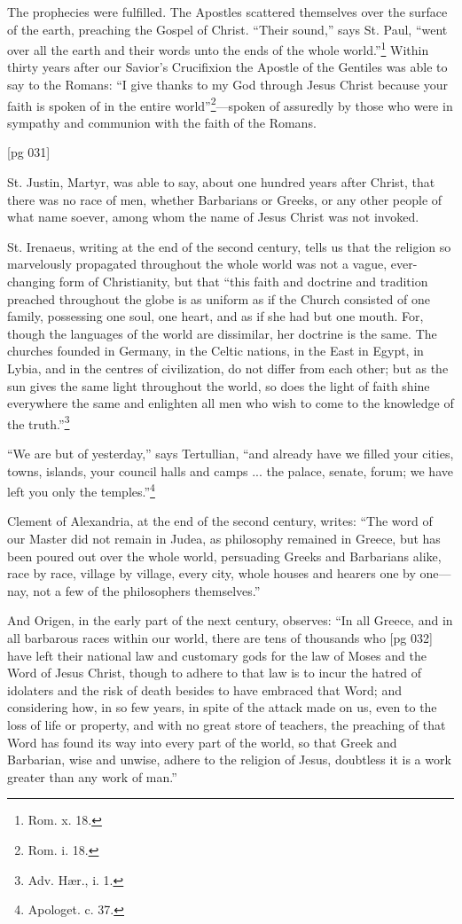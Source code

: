 The prophecies were fulfilled. The Apostles
scattered themselves over the surface of the earth,
preaching the Gospel of Christ. “Their sound,”
says St. Paul, “went over all the earth and their
words unto the ends of the whole world.”\footnote{Rom. x. 18.} Within
thirty years after our Savior's Crucifixion the
Apostle of the Gentiles was able to say to the
Romans: “I give thanks to my God through Jesus
Christ because your faith is spoken of in the entire
world”\footnote{Rom. i. 18.}—spoken of assuredly by those who
were in sympathy and communion with the faith
of the Romans.

[pg 031]

St. Justin, Martyr, was able to say, about one
hundred years after Christ, that there was no race
of men, whether Barbarians or Greeks, or any
other people of what name soever, among whom
the name of Jesus Christ was not invoked.

St. Irenaeus, writing at the end of the second
century, tells us that the religion so marvelously
propagated throughout the whole world was not a
vague, ever-changing form of Christianity, but
that “this faith and doctrine and tradition
preached throughout the globe is as uniform as if
the Church consisted of one family, possessing one
soul, one heart, and as if she had but one mouth.
For, though the languages of the world are dissimilar,
her doctrine is the same. The churches founded
in Germany, in the Celtic nations, in the East
in Egypt, in Lybia, and in the centres of civilization,
do not differ from each other; but as the sun
gives the same light throughout the world, so does
the light of faith shine everywhere the same and
enlighten all men who wish to come to the knowledge
of the truth.”\footnote{Adv. Hær., i. 1.}

“We are but of yesterday,” says Tertullian,
“and already have we filled your cities, towns, islands,
your council halls and camps ... the palace,
senate, forum; we have left you only the temples.”\footnote{Apologet.
c. 37.}

Clement of Alexandria, at the end of the second
century, writes: “The word of our Master did not
remain in Judea, as philosophy remained in Greece,
but has been poured out over the whole world, persuading
Greeks and Barbarians alike, race by race,
village by village, every city, whole houses and
hearers one by one—nay, not a few of the philosophers
themselves.”

And Origen, in the early part of the next century,
observes: “In all Greece, and in all barbarous races
within our world, there are tens of thousands who
[pg 032]
have left their national law and customary gods
for the law of Moses and the Word of Jesus
Christ, though to adhere to that law is to incur the
hatred of idolaters and the risk of death besides
to have embraced that Word; and considering how,
in so few years, in spite of the attack made on us,
even to the loss of life or property, and with no
great store of teachers, the preaching of that Word
has found its way into every part of the world, so
that Greek and Barbarian, wise and unwise, adhere
to the religion of Jesus, doubtless it is a work
greater than any work of man.”

